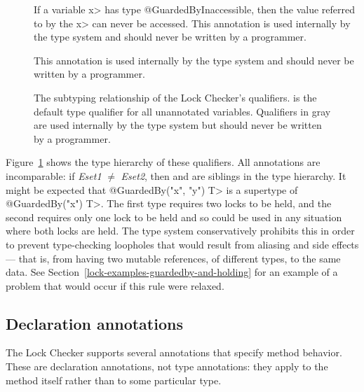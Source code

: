 \begin{description}
\item[]
  If a variable \<x> has type @GuardedByInaccessible, then
  the value referred to by the \<x> can never be accessed.
  This annotation is used internally by the type system
  and should never be written by a programmer.

\item[]
  This annotation is used internally by the type system
  and should never be written by a programmer.

\end{description}

\begin{figure}
\caption{The subtyping relationship of the Lock Checker's qualifiers.
 is the default type qualifier for all unannotated
variables.
Qualifiers in gray
are used internally by the type system but should never be written by a
programmer.}
\label{fig-lock-guardedby-hierarchy}
\end{figure}

Figure~\ref{fig-lock-guardedby-hierarchy} shows the type hierarchy of these
qualifiers.
All  annotations are incomparable:
if \emph{Eset1} $\neq$ \emph{Eset2}, then  and
 are siblings in the type hierarchy.
It might be expected that
\<@GuardedBy({"x", "y"}) T> is a supertype of \<@GuardedBy({"x"}) T>.  The
first type requires two locks to be held, and the second requires only one
lock to be held and so could be used in any situation where both locks are
held.  The type system conservatively prohibits this in order to prevent
type-checking loopholes that would result from aliasing and side effects
--- that is, from having two mutable references, of different types, to the
same data. See
Section~\ref{lock-examples-guardedby-and-holding} for an example
of a problem that would occur if this rule were relaxed.


\subsection{Declaration annotations\label{lock-declaration-annotations}}

The Lock Checker supports several annotations that specify method behavior.
These are declaration annotations, not type annotations: they apply to the
method itself rather than to some particular type.

